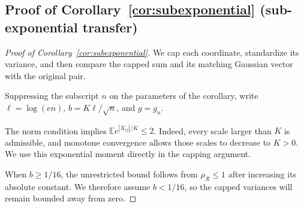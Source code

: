 \documentclass[11pt,letterpaper]{article}
\newcommand{\vSix}[1]{{\color{magenta}#1}}
\theoremstyle{remark}
\newcommand{\E}{\mathbb E}
\newcommand{\rh}{\rho_{\mathcal R}}
\begin{document}
\subsection{Proof of Corollary~\ref*{cor:subexponential} (sub-exponential transfer)}\label{app:subexponential}
\begin{proof}[Proof of Corollary~\ref{cor:subexponential}]

We \vSix{cap} each coordinate, standardize its variance, and then compare the
\vSix{capped} sum and its matching Gaussian vector with the original pair.

Suppressing the subscript \(n\) on the parameters of the corollary,
write \(\ell=\log(en)\), \(b=K\ell/\sqrt n\), and \vSix{\(g=g_n\)}.

The norm condition implies \(\E e^{|X_{ij}|/K}\le2\). Indeed,
every scale larger than \(K\) is admissible, and monotone convergence
allows those scales to decrease to \(K>0\). We use this exponential
moment directly in the \vSix{capping} argument.

When \(b\ge1/16\), the unrestricted bound follows from
\(\rh\le1\) after increasing its absolute constant. We therefore
assume \(b<1/16\), so the \vSix{capped} variances will remain bounded
away from zero.


\end{proof}
\end{document}
